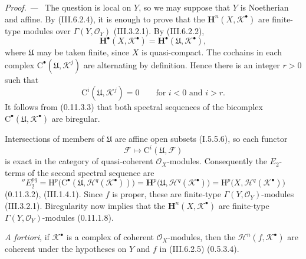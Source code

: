 \documentclass[10pt,oneside]{book}
\newcommand{\sh}[1]{\mathscr{#1}}
\newcommand{\HH}{\mathrm H}
\newcommand{\sref}[2][]{(#2)}
\newenvironment{proof}{\par\medskip\noindent\textit{Proof. ---\ }}{\par}
\begin{document}
\begin{proof}
The question is local on $Y$, so we may suppose that $Y$ is
Noetherian and affine.  By \sref{III.6.2.4}, it is enough to prove
that the $\mathbf{H}^n(X,\sh{K}^\bullet)$ are finite-type modules
over $\Gamma(Y,\sh{O}_Y)$ \sref{III.3.2.1}.  By
\sref{III.6.2.2},
\[
  \mathbf{H}^\bullet(X,\sh{K}^\bullet)
  =
  \mathbf{H}^\bullet(\mathfrak{U},\sh{K}^\bullet),
\]
where $\mathfrak{U}$ may be taken finite, since $X$ is
quasi-compact.  The cochains in each complex
$\mathrm{C}^\bullet(\mathfrak{U},\sh{K}^j)$ are alternating by
definition.  Hence there is an integer $r>0$ such that
\[
  \mathrm{C}^i(\mathfrak{U},\sh{K}^j)=0
  \qquad\text{for }i<0\text{ and }i>r.
\]
It follows from \sref[0]{0.11.3.3} that both spectral sequences of
the bicomplex
$\mathrm{C}^\bullet(\mathfrak{U},\sh{K}^\bullet)$ are biregular.

Intersections of members of $\mathfrak{U}$ are affine open subsets
\sref[I]{I.5.5.6}, so each functor
\[
  \sh{F}\longmapsto\mathrm{C}^i(\mathfrak{U},\sh{F})
\]
is exact in the category of quasi-coherent $\sh{O}_X$-modules.
Consequently the $E_2$-terms of the second spectral sequence are
\[
  ''E_2^{pq}
  =
  \HH^p\bigl(
    \mathrm{C}^\bullet(
      \mathfrak{U},\sh{H}^q(\sh{K}^\bullet)
    )
  \bigr)
  =
  \mathbf{H}^p\bigl(
    \mathfrak{U},\sh{H}^q(\sh{K}^\bullet)
  \bigr)
  =
  \HH^p\bigl(X,\sh{H}^q(\sh{K}^\bullet)\bigr)
\]
\sref[0]{0.11.3.2}, \sref{III.1.4.1}.  Since $f$ is proper, these
are finite-type $\Gamma(Y,\sh{O}_Y)$-modules
\sref{III.3.2.1}.  Biregularity now implies that the
$\mathbf{H}^n(X,\sh{K}^\bullet)$ are finite-type
$\Gamma(Y,\sh{O}_Y)$-modules \sref[0]{0.11.1.8}.

\emph{A fortiori}, if $\sh{K}^\bullet$ is a complex of coherent
$\sh{O}_X$-modules, then the
$\mathcal{H}^n(f,\sh{K}^\bullet)$ are coherent under the
hypotheses on $Y$ and $f$ in \sref{III.6.2.5}
\sref[0]{0.5.3.4}.
\end{proof}
\end{document}
